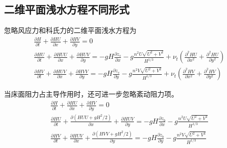 \subsection{二维平面浅水方程不同形式}
忽略风应力和科氏力的二维平面浅水方程为
\begin{equation}
  \begin{gathered}
  \frac{\partial H}{\partial t} +
  \frac{\partial HU}{\partial x} +
  \frac{\partial HV}{\partial y}
  =
  0
    \\
  \frac{\partial HU}{\partial t} +
  \frac{\partial HUU}{\partial x} +
  \frac{\partial HUV}{\partial y} 
  =
  -gH\frac{\partial  z_{s}}{\partial x}
  -g\frac{n^{2}U\sqrt{U^{2}+V^{2}}}{H^{1/3}}
  +
  \nu_{t}\left(
    \frac{\partial^{2}HU}{\partial x^{2}}+
    \frac{\partial^{2}HU}{\partial y^{2}}
\right)
    \\
  \frac{\partial HV}{\partial t} +
  \frac{\partial HUV}{\partial x} +
  \frac{\partial HVV}{\partial y} 
  =
  -gH\frac{\partial  z_{s}}{\partial y}
  -g\frac{n^{2}V\sqrt{U^{2}+V^{2}}}{H^{1/3}}
  +
  \nu_{t}\left(
    \frac{\partial^{2}HV}{\partial x^{2}}+
    \frac{\partial^{2}HV}{\partial y^{2}}
\right)
  \end{gathered}
\end{equation}

当床面阻力占主导作用时，还可进一步忽略紊动阻力项。
\begin{equation}
  \begin{gathered}
  \frac{\partial H}{\partial t} +
  \frac{\partial HU}{\partial x} +
  \frac{\partial HV}{\partial y}
  =
  0
    \\
  \frac{\partial HU}{\partial t} +
  \frac{\partial (HUU+gH^{2}/2)}{\partial x} +
  \frac{\partial HUV}{\partial y} 
  =
  -gH\frac{\partial z_{b}}{\partial x}
  -g\frac{n^{2}U\sqrt{U^{2}+V^{2}}}{H^{1/3}}
    \\
  \frac{\partial HV}{\partial t} +
  \frac{\partial HUV}{\partial x} +
  \frac{\partial (HVV+gH^{2}/2)}{\partial y} 
  =
  -gH\frac{\partial z_{b}}{\partial y}
  -g\frac{n^{2}V\sqrt{U^{2}+V^{2}}}{H^{1/3}}
  \end{gathered}
\end{equation}

